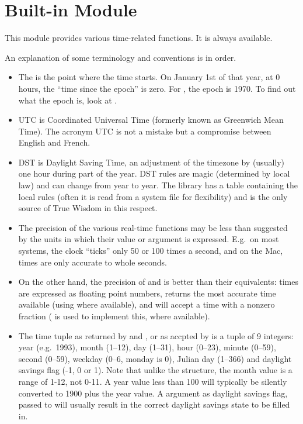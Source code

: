 \section{Built-in Module }
\label{module-time}

This module provides various time-related functions.
It is always available.

An explanation of some terminology and conventions is in order.

\begin{itemize}

\item
{}
The  is the point where the time starts.  On January 1st of that
year, at 0 hours, the ``time since the epoch'' is zero.  For \UNIX{}, the
epoch is 1970.  To find out what the epoch is, look at .

\item
{}
UTC is Coordinated Universal Time (formerly known as Greenwich Mean
Time).  The acronym UTC is not a mistake but a compromise between
English and French.

\item
{}
DST is Daylight Saving Time, an adjustment of the timezone by
(usually) one hour during part of the year.  DST rules are magic
(determined by local law) and can change from year to year.  The \C{}
library has a table containing the local rules (often it is read from
a system file for flexibility) and is the only source of True Wisdom
in this respect.

\item
The precision of the various real-time functions may be less than
suggested by the units in which their value or argument is expressed.
E.g.\ on most \UNIX{} systems, the clock ``ticks'' only 50 or 100 times a
second, and on the Mac, times are only accurate to whole seconds.

\item
On the other hand, the precision of  and
 is better than their \UNIX{} equivalents: times are
expressed as floating point numbers,  returns the
most accurate time available (using \UNIX{} 
where available), and  will accept a time with a
nonzero fraction (\UNIX{}  is used to implement
this, where available).

\item
The time tuple as returned by  and
, or as accpted by  is a
tuple of 9 integers: year (e.g.\ 1993), month (1--12), day (1--31),
hour (0--23), minute (0--59), second (0--59), weekday (0--6, monday is
0), Julian day (1--366) and daylight savings flag (-1, 0  or 1).
Note that unlike the \C{} structure, the month value is a range of 1-12, not
0-11.  A year value less than 100 will typically be silently converted to
1900 plus the year value.  A  argument as daylight savings
flag, passed to  will usually result in the correct
daylight savings state to be filled in.


\end{itemize}

